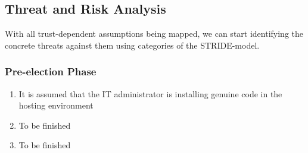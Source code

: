\subsection{Threat and Risk Analysis} 
With all trust-dependent assumptions being mapped, we can start identifying the concrete threats against them using categories of the STRIDE-model.


\subsubsection{Pre-election Phase} 

\begin{enumerate}
  \item It is assumed that the IT administrator is installing genuine code in the hosting environment
  \item To be finished
  \item To be finished
\end{enumerate}

